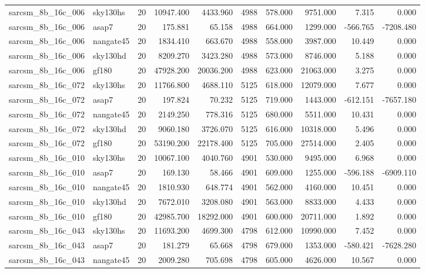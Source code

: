 \begin{longtable}{llrrrrrrrr}
sarcsm\_8b\_16c\_006 & sky130hs & 20 & 10947.400 & 4433.960 & 4988 & 578.000 & 9751.000 & 7.315 & 0.000 \\
sarcsm\_8b\_16c\_006 & asap7 & 20 & 175.881 & 65.158 & 4988 & 664.000 & 1299.000 & -566.765 & -7208.480 \\
sarcsm\_8b\_16c\_006 & nangate45 & 20 & 1834.410 & 663.670 & 4988 & 558.000 & 3987.000 & 10.449 & 0.000 \\
sarcsm\_8b\_16c\_006 & sky130hd & 20 & 8209.270 & 3423.280 & 4988 & 573.000 & 8746.000 & 5.188 & 0.000 \\
sarcsm\_8b\_16c\_006 & gf180 & 20 & 47928.200 & 20036.200 & 4988 & 623.000 & 21063.000 & 3.275 & 0.000 \\
sarcsm\_8b\_16c\_072 & sky130hs & 20 & 11766.800 & 4688.110 & 5125 & 618.000 & 12079.000 & 7.677 & 0.000 \\
sarcsm\_8b\_16c\_072 & asap7 & 20 & 197.824 & 70.232 & 5125 & 719.000 & 1443.000 & -612.151 & -7657.180 \\
sarcsm\_8b\_16c\_072 & nangate45 & 20 & 2149.250 & 778.316 & 5125 & 680.000 & 5511.000 & 10.431 & 0.000 \\
sarcsm\_8b\_16c\_072 & sky130hd & 20 & 9060.180 & 3726.070 & 5125 & 616.000 & 10318.000 & 5.496 & 0.000 \\
sarcsm\_8b\_16c\_072 & gf180 & 20 & 53190.200 & 22178.400 & 5125 & 705.000 & 27514.000 & 2.405 & 0.000 \\
sarcsm\_8b\_16c\_010 & sky130hs & 20 & 10067.100 & 4040.760 & 4901 & 530.000 & 9495.000 & 6.968 & 0.000 \\
sarcsm\_8b\_16c\_010 & asap7 & 20 & 169.130 & 58.466 & 4901 & 609.000 & 1255.000 & -596.188 & -6909.110 \\
sarcsm\_8b\_16c\_010 & nangate45 & 20 & 1810.930 & 648.774 & 4901 & 562.000 & 4160.000 & 10.451 & 0.000 \\
sarcsm\_8b\_16c\_010 & sky130hd & 20 & 7672.010 & 3208.080 & 4901 & 563.000 & 8833.000 & 4.433 & 0.000 \\
sarcsm\_8b\_16c\_010 & gf180 & 20 & 42985.700 & 18292.000 & 4901 & 600.000 & 20711.000 & 1.892 & 0.000 \\
sarcsm\_8b\_16c\_043 & sky130hs & 20 & 11693.200 & 4699.300 & 4798 & 612.000 & 10990.000 & 7.452 & 0.000 \\
sarcsm\_8b\_16c\_043 & asap7 & 20 & 181.279 & 65.668 & 4798 & 679.000 & 1353.000 & -580.421 & -7628.280 \\
sarcsm\_8b\_16c\_043 & nangate45 & 20 & 2009.280 & 705.698 & 4798 & 605.000 & 4626.000 & 10.567 & 0.000 \\

\end{longtable}
